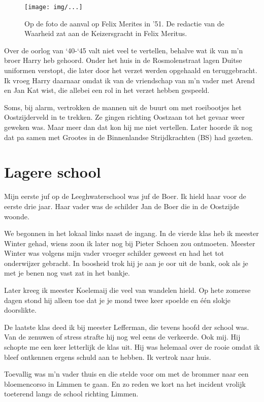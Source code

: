 \documentclass[10pt,twoside,openright]{memoir}
\begin{document}
\begin{figure}[t]
\texttt{[image: img/...]}
\caption{Op de foto de aanval op Felix Merites in ’51. De redactie van de Waarheid zat aan de Keizersgracht in Felix Meritus.}
\end{figure}

Over de oorlog van `40-`45 valt niet veel te vertellen, behalve wat ik van m’n broer Harry heb gehoord. Onder het huis in de Rosmolenstraat lagen Duitse uniformen verstopt, die later door het verzet werden opgehaald en teruggebracht. Ik vroeg Harry daarnaar omdat ik van de vriendschap van m’n vader met Arend en Jan Kat wist, die allebei een rol in het verzet hebben gespeeld. 

Soms, bij alarm, vertrokken de mannen uit de buurt om met roeibootjes het Oostzijderveld in te trekken. Ze gingen richting Oostzaan tot het gevaar weer geweken was. Maar meer dan dat kon hij me niet vertellen. Later hoorde ik nog dat pa samen met Grootes in de Binnenlandse Strijdkrachten (BS) had gezeten.

\chapter{Lagere school} %
\label{cha:lagere_school}

Mijn eerste juf op de Leeghwaterschool was juf de Boer. Ik hield haar voor de eerste drie jaar. Haar vader was de schilder Jan de Boer die in de Oostzijde woonde. 

We begonnen in het lokaal links naast de ingang. In de vierde klas heb ik meester Winter gehad, wiens zoon ik later nog bij Pieter Schoen zou ontmoeten. Meester Winter was volgens mijn vader vroeger schilder geweest en had het tot onderwijzer gebracht. In boosheid trok hij je aan je oor uit de bank, ook als je met je benen nog vast zat in het bankje. 

Later kreeg ik meester Koelemaij die veel van wandelen hield. Op hete zomerse dagen stond hij alleen toe dat je je mond twee keer spoelde en één slokje doorslikte. 

De laatste klas deed ik bij meester Lefferman, die tevens hoofd der school was. Van de zenuwen of stress strafte hij nog wel eens de verkeerde. Ook mij. Hij schopte me een keer letterlijk de klas uit. Hij was helemaal over de rooie omdat ik bleef ontkennen ergens schuld aan te hebben. Ik vertrok naar huis. 

Toevallig was m’n vader thuis en die stelde voor om met de brommer naar een bloemencorso in Limmen te gaan. En zo reden we kort na het incident vrolijk toeterend langs de school richting Limmen. 
\end{document}
